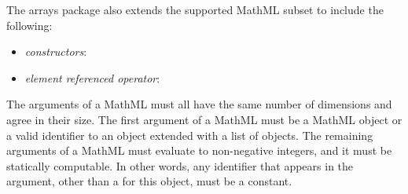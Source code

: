 The arrays package also extends the supported MathML subset to include the following:
\begin{itemize}
\item \emph{constructors}: 
\item \emph{element referenced operator}: 
\end{itemize}
The arguments of a MathML  must all have the same number of dimensions and agree in their size. The first argument of a MathML  must be a MathML  object or a valid identifier to an \SBase object extended with a list of \Dimension objects. The remaining arguments of a MathML  must evaluate to non-negative integers, and it must be statically computable.  In other words, any identifier that appears in the argument, other than a \Dimension {} for this object, must be a constant.